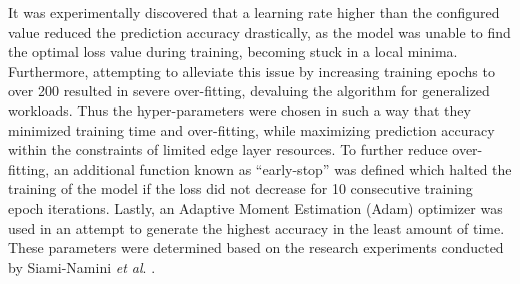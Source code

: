  It was experimentally discovered that a learning rate higher than the configured value reduced the prediction accuracy drastically, as the model was unable to find the optimal loss value during training, becoming stuck in a local minima. Furthermore, attempting to alleviate this issue by increasing training epochs to over 200 resulted in severe over-fitting, devaluing the algorithm for generalized workloads. Thus the hyper-parameters were chosen in such a way that they minimized training time and over-fitting, while maximizing prediction accuracy within the constraints of limited edge layer resources. To further reduce over-fitting, an additional function known as ``early-stop'' was defined which halted the training of the model if the loss did not decrease for 10 consecutive training epoch iterations. Lastly, an Adaptive Moment Estimation (Adam) optimizer \cite{diederik2014adam} was used in an attempt to generate the highest accuracy in the least amount of time. These parameters were determined based on the research experiments conducted by Siami-Namini \textit{et al}. \cite{siami2018comparison}.\par

\begin{center}
    \label{fig:loss-mse-training}
    \qquad
\end{center}

